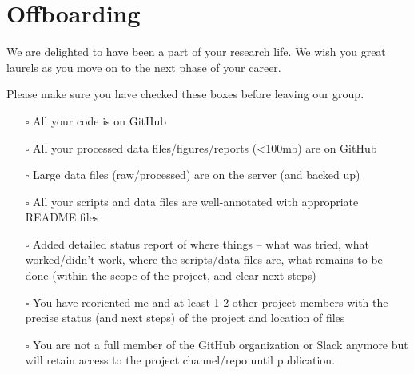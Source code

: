 \documentclass[
  letterpaper,
  DIV=11,
  numbers=noendperiod]{scrreprt}
\begin{document}
\hypertarget{offboarding}{%
\chapter{Offboarding}\label{offboarding}}

We are delighted to have been a part of your research life. We wish you
great laurels as you move on to the next phase of your career.

Please make sure you have checked these boxes before leaving our group.

\begin{itemize}
\item[$\square$]
  All your code is on GitHub
\item[$\square$]
  All your processed data files/figures/reports (\textless100mb) are on
  GitHub
\item[$\square$]
  Large data files (raw/processed) are on the server (and backed up)
\item[$\square$]
  All your scripts and data files are well-annotated with appropriate
  README files
\item[$\square$]
  Added detailed status report of where things -- what was tried, what
  worked/didn't work, where the scripts/data files are, what remains to
  be done (within the scope of the project, and clear next steps)
\item[$\square$]
  You have reoriented me and at least 1-2 other project members with the
  precise status (and next steps) of the project and location of files
\item[$\square$]
  You are not a full member of the GitHub organization or Slack anymore
  but will retain access to the project channel/repo until publication.
\end{itemize}
\end{document}

